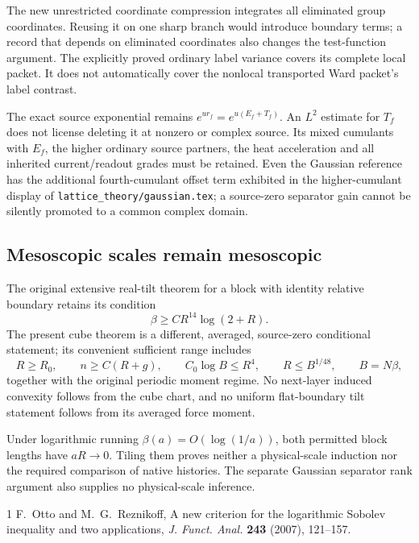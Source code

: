\documentclass[11pt]{article}
\theoremstyle{definition}\newtheorem{definition}[theorem]{Definition}
\theoremstyle{remark}\newtheorem{remark}[theorem]{Remark}
\begin{document}
The new unrestricted coordinate compression integrates all eliminated group coordinates. Reusing it on one sharp branch would introduce boundary terms; a record that depends on eliminated coordinates also changes the test-function argument. The explicitly proved ordinary label variance covers its complete local packet. It does not automatically cover the nonlocal transported Ward packet's label contrast.

The exact source exponential remains \(e^{u r_f}=e^{u(E_f+T_f)}\). An \(L^2\) estimate for \(T_f\) does not license deleting it at nonzero or complex source. Its mixed cumulants with \(E_f\), the higher ordinary source partners, the heat acceleration and all inherited current/readout grades must be retained. Even the Gaussian reference has the additional fourth-cumulant offset term exhibited in the higher-cumulant display of \texttt{lattice\_theory/gaussian.tex}; a source-zero separator gain cannot be silently promoted to a common complex domain.

\subsection{Mesoscopic scales remain mesoscopic}

The original extensive real-tilt theorem for a block with identity relative boundary retains its condition
\[
 \beta\ge CR^{14}\log(2+R).
\]
The present cube theorem is a different, averaged, source-zero conditional statement; its convenient sufficient range includes
\[
 R\ge R_0,\qquad n\ge C(R+g),\qquad
 C_0\log B\le R^4,\qquad R\le B^{1/48},\qquad B=N\beta,
\]
together with the original periodic moment regime. No next-layer induced convexity follows from the cube chart, and no uniform flat-boundary tilt statement follows from its averaged force moment.

Under logarithmic running \(\beta(a)=O(\log(1/a))\), both permitted block lengths have \(aR\to0\). Tiling them proves neither a physical-scale induction nor the required comparison of native histories. The separate Gaussian separator rank argument also supplies no physical-scale inference.
\begin{thebibliography}{1}
 F.~Otto and M.~G.~Reznikoff, A new criterion for the logarithmic Sobolev inequality and two applications, \emph{J. Funct. Anal.} \textbf{243} (2007), 121--157.
\end{thebibliography}
\end{document}
